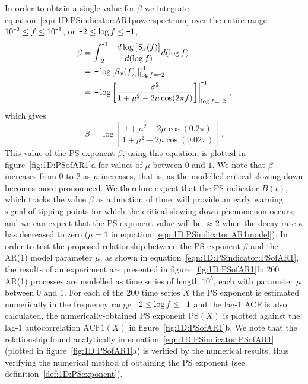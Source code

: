 {{{In order to obtain a single value for $\beta$ we integrate equation~\ref{eqn:1D:PSindicator:AR1powerspectrum} over the entire range $10^{\textup{\texttt{-}}2}\leq f \leq 10^{\textup{\texttt{-}}1}$, or $\textup{\texttt{-}}2\leq \log f \leq\textup{\texttt{-}}1$, 
	\begin{equation}
	\begin{split}
		\beta &= \int_{\textup{\texttt{-}}2}^{\textup{\texttt{-}}1}-\frac{d\log\left[S_x(f)\right]}{d(\log f)}d(\log f)\\
		&= \left. \textup{\texttt{-}}\log\left[S_x(f)\right] \right|_{\log f = \textup{\texttt{-}}2}^{\textup{\texttt{-}}1}\\
		&= \left. \textup{\texttt{-}}\log\left[  \frac{\sigma^2}{1+\mu^2-2\mu \cos(2\pi f)}  \right] \right|_{\log f = \textup{\texttt{-}}2}^{\textup{\texttt{-}}1}\,,
	\end{split}
	\end{equation}
which gives 
	\begin{equation}
	\label{eqn:1D:PSindicator:PSofAR1}
		\beta = \log\left[  \frac{1+\mu^2-2\mu \cos(0.2\pi)}{1+\mu^2-2\mu \cos(0.02\pi)}  \right] \,.
	\end{equation}
This value of the PS exponent $\beta$, using this equation, is plotted in figure~\ref{fig:1D:PSofAR1}a for values of $\mu$ between $0$ and $1$. We note that $\beta$ increases from $0$ to $2$ as $\mu$ increases, that is, as the modelled critical slowing down becomes more pronounced. We therefore expect that the PS indicator $B(t)$, which tracks the value $\beta$ as a function of time, will provide an early warning signal of tipping points for which the critical slowing down phenomenon occurs, and we can expect that the PS exponent value will be $\approx 2$ when the decay rate $\kappa$ has decreased to zero ($\mu=1$ in equation~\ref{eqn:1D:PSindicator:AR1model}). In order to test the proposed relationship between the PS exponent $\beta$ and the AR(1) model parameter $\mu$, as shown in equation~\ref{eqn:1D:PSindicator:PSofAR1}, the results of an experiment are presented in figure~\ref{fig:1D:PSofAR1}b: $200$ AR(1) processes are modelled as time series of length $10^5$, each with parameter $\mu$ between $0$ and $1$. For each of the $200$ time series $X$ the PS exponent is estimated numerically in the frequency range $\textup{\texttt{-}}2\leq\log f\leq\textup{\texttt{-}}1$ and the lag-1 ACF is also calculated, the numerically-obtained PS exponent $\text{PS}(X)$ is plotted against the lag-1 autocorrelation $\text{ACF1}(X)$ in figure~\ref{fig:1D:PSofAR1}b. We note that the relationship found analytically in equation~\ref{eqn:1D:PSindicator:PSofAR1} (plotted in figure~\ref{fig:1D:PSofAR1}a) is verified by the numerical results, thus verifying the numerical method of obtaining the PS exponent (see definition~\ref{def:1D:PSexponent}).

}}}
